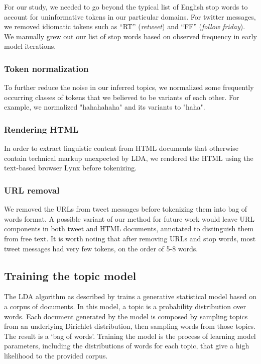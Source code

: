 \documentclass[times, 11pt, twocolumn]{article}
\begin{document}
For our study, we needed to go beyond the typical list of English stop words to account for uninformative tokens in our particular domains.
For twitter messages, we removed idiomatic tokens such as ``RT'' (\emph{retweet}) and ``FF'' (\emph{follow friday}). 
We manually grew out our list of stop words based on observed frequency
in early model iterations.

\subsubsection{Token normalization}

To further reduce the noise in our inferred topics, we normalized some frequently occurring classes of tokens
that we believed to be variants of each other.
For example, we normalized "hahahahaha" and its variants to "haha".

\subsubsection{Rendering HTML}

In order to extract linguistic content from HTML documents that otherwise contain technical markup unexpected by LDA,
we rendered the HTML using the text-based browser Lynx before tokenizing.

\subsubsection{URL removal}

We removed the URLs from tweet messages before tokenizing them into bag of words format.
A possible variant of our method for future work would leave URL components in both tweet and HTML documents,
annotated to distinguish them from free text.
It is worth noting that after removing URLs and stop words, most tweet messages had very few tokens, on the order of 5-8 words.


\subsection{Training the topic model}

The LDA algorithm as described by \cite{Blei2003} trains a generative statistical model based on a corpus of documents.
In this model, a topic is a probability distribution over words.
Each document generated by the model is composed by sampling topics from an underlying Dirichlet distribution,
then sampling words from those topics.
The result is a `bag of words'.
Training the model is the process of learning model parameters, including the distributions of words for each topic, that give a high likelihood to the provided corpus.
\end{document}
